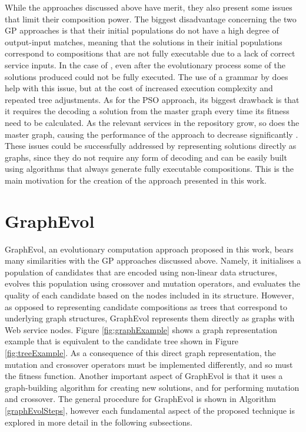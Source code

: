 \documentclass{article}
\begin{document}
While the approaches discussed above have merit, they also present some issues that limit their composition power. The biggest disadvantage concerning the two GP approaches is that their initial populations do not have a high degree of output-input matches, meaning that the solutions in their initial populations correspond to compositions that are not fully executable due to a lack of correct service inputs. In the case of \cite{aversano2006genetic}, even after the evolutionary process some of the solutions produced could not be fully executed. The use of a grammar by \cite{rodriguez2010composition} does help with this issue, but at the cost of increased execution complexity and repeated tree adjustments. As for the PSO approach, its biggest drawback is that it requires the decoding a solution from the master graph every time its fitness need to be calculated. As the relevant services in the
repository grow, so does the master graph, causing the performance of the approach to decrease significantly \cite{silva2014graph}. These issues could be successfully addressed
by representing solutions directly as graphs, since they do not require any form of decoding and can be easily built using algorithms that always generate fully executable compositions. This is the main motivation for the creation of the approach presented in this work.

\section{GraphEvol}\label{graphevol}
GraphEvol, an evolutionary computation approach proposed in this work, bears many similarities with the GP approaches discussed above. Namely, it initialises a population 
of candidates that are encoded using non-linear data structures, evolves this population using crossover and mutation operators, and evaluates the quality of each candidate
based on the nodes included in its structure. However, as opposed to representing candidate compositions as trees that correspond to underlying graph structures, GraphEvol
represents them directly as graphs with Web service nodes. Figure \ref{fig:graphExample} shows a graph representation example that is equivalent to the candidate tree shown in Figure \ref{fig:treeExample}. As a consequence of this direct graph representation, the mutation and crossover operators must be implemented differently, and so must the fitness function. Another important aspect of GraphEvol is that it uses a graph-building algorithm for creating new  solutions, and for performing mutation and crossover. The general procedure for GraphEvol is shown in Algorithm \ref{graphEvolSteps}, however each fundamental aspect of the proposed technique is explored in more detail in the following subsections.
\end{document}
